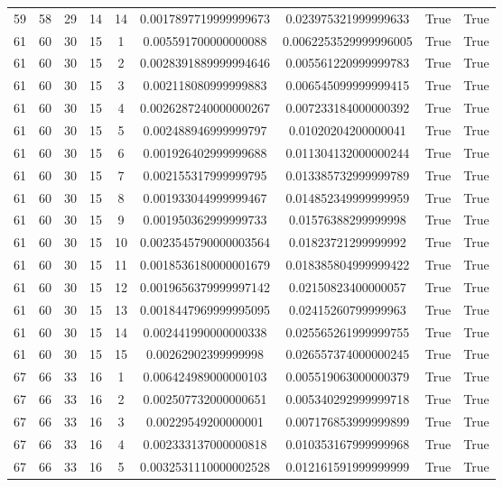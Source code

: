 \documentclass[a4paper,11pt]{article}
\begin{document}
\begin{landscape}
\begin{longtable}{ccccccccc}
59 & 58 & 29 & 14 & 14 & 0.0017897719999999673 & 0.023975321999999633 & True & True \\
61 & 60 & 30 & 15 & 1 & 0.005591700000000088 & 0.0062253529999996005 & True & True \\
61 & 60 & 30 & 15 & 2 & 0.0028391889999994646 & 0.005561220999999783 & True & True \\
61 & 60 & 30 & 15 & 3 & 0.002118080999999883 & 0.006545099999999415 & True & True \\
61 & 60 & 30 & 15 & 4 & 0.0026287240000000267 & 0.007233184000000392 & True & True \\
61 & 60 & 30 & 15 & 5 & 0.002488946999999797 & 0.01020204200000041 & True & True \\
61 & 60 & 30 & 15 & 6 & 0.001926402999999688 & 0.011304132000000244 & True & True \\
61 & 60 & 30 & 15 & 7 & 0.002155317999999795 & 0.013385732999999789 & True & True \\
61 & 60 & 30 & 15 & 8 & 0.001933044999999467 & 0.014852349999999959 & True & True \\
61 & 60 & 30 & 15 & 9 & 0.001950362999999733 & 0.01576388299999998 & True & True \\
61 & 60 & 30 & 15 & 10 & 0.0023545790000003564 & 0.01823721299999992 & True & True \\
61 & 60 & 30 & 15 & 11 & 0.0018536180000001679 & 0.018385804999999422 & True & True \\
61 & 60 & 30 & 15 & 12 & 0.0019656379999997142 & 0.02150823400000057 & True & True \\
61 & 60 & 30 & 15 & 13 & 0.0018447969999995095 & 0.02415260799999963 & True & True \\
61 & 60 & 30 & 15 & 14 & 0.002441990000000338 & 0.025565261999999755 & True & True \\
61 & 60 & 30 & 15 & 15 & 0.00262902399999998 & 0.026557374000000245 & True & True \\
67 & 66 & 33 & 16 & 1 & 0.006424989000000103 & 0.005519063000000379 & True & True \\
67 & 66 & 33 & 16 & 2 & 0.002507732000000651 & 0.005340292999999718 & True & True \\
67 & 66 & 33 & 16 & 3 & 0.00229549200000001 & 0.007176853999999899 & True & True \\
67 & 66 & 33 & 16 & 4 & 0.002333137000000818 & 0.010353167999999968 & True & True \\
67 & 66 & 33 & 16 & 5 & 0.0032531110000002528 & 0.012161591999999999 & True & True \\

\end{longtable}
\end{landscape}
\end{document}
